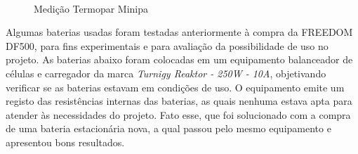 \begin{figure}[H]
    \centering
    \includegraphics[width=0.7]{figuras/medicao_termopar}
    \caption{Medição Termopar Minipa}
    \label{fig:medicao_termopar}
\end{figure}

		 Algumas baterias usadas foram testadas anteriormente à compra da FREEDOM DF500, para fins experimentais e para avaliação da possibilidade de uso no projeto. As baterias abaixo foram colocadas em um equipamento balanceador de células e carregador da marca \textit{Turnigy Reaktor - 250W - 10A}, objetivando verificar se as baterias estavam em condições de uso. O equipamento emite um registo das resistências internas das baterias, as quais nenhuma estava apta para atender às necessidades do projeto. Fato esse, que foi solucionado com a compra de uma bateria estacionária nova, a qual passou pelo mesmo equipamento e apresentou bons resultados.
         
